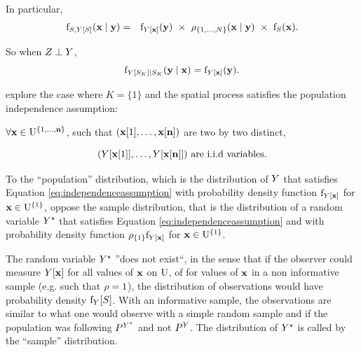 In particular,
\begin{eqnarray}\mathrm{f}_{S,Y[S]}(\mathbf{x}\mid\mathbf{y})&=& \mathrm{f}_{Y[\mathbf{x}]}(\mathbf{y})~\times~\rho_{\{1,\ldots,N\}}(\mathbf{x}\mid\mathbf{y})~\times~\mathrm{f}_{S}(\mathbf{x})
.\label{eq:iuhsdewripeowi3}
\end{eqnarray}


So when $Z\perp Y$,
\begin{equation}\mathrm{f}_{Y[S_K]\mid S_K}(\mathbf{y}\mid \mathbf{x})= \mathrm{f}_{Y[\mathbf{x}]}(\mathbf{y}).\label{eq:iuhsdewripeowi2}\end{equation}

\cite{pfefferman_1992} explore  the case where
$K=\{1\}$ and the spatial process satisfies the  population independence assumption:

$\forall \mathbf{x}\in\mathrm{U}^{\{1,\ldots,\mathbf{n}\}}$, such that $(\mathbf{x}[1],\ldots,\mathbf{x}[\mathbf{n}])$ are two by two  distinct,

\begin{equation}
(Y[\mathbf{x}[1]],\ldots,Y[\mathbf{x}[\mathbf{n}]])\text{ are i.i.d variables}.
\label{eq:independenceassumption}
\end{equation}

To the ``population'' distribution, which is the distribution of $Y$ that satisfies Equation \eqref{eq:independenceassumption} with probability density function $\mathrm{f}_{Y[\mathbf{x}]}$ for $\mathbf{x} \in\mathrm{U}^{\{1\}}$, \cite{pfefferman_1992} oppose the sample distribution, that is the  distribution of a random variable $Y^\star$ that satisfies Equation \eqref{eq:independenceassumption}  and with probability density function  $\rho_{\{1\}}\mathrm{f}_{Y[\mathbf{x}]}$ for $\mathbf{x} \in\mathrm{U}^{\{1\}}$.

The random variable $Y^\star$ ''does not exist``, in the sense that if the observer could measure $Y[\mathbf{x}]$ for all values of $\mathbf{x}$ on $\mathrm{U}$, of for values of $\mathbf{x}$ in a non informative sample (e.g. such that $\rho=1$), the distribution of  observations would have probability density $\mathrm{f}_Y[S]$.
With an informative sample, the observations are similar to what one would observe with a simple random sample and if the population was following $P^{Y^\star}$ and not $P^Y$. The distribution of $Y^\star$ is called by \cite{pfefferman_1992} the ``sample'' distribution.

